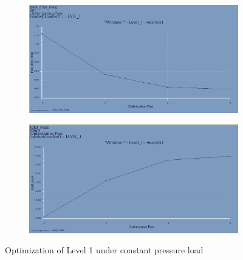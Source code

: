 \documentclass[12pt,letterpaper]{report}
\begin{document}
		\begin{figure}[H]
			\centering
			\begin{subfigure}{.45\textwidth}
				\includegraphics[width=\textwidth]{L1OptimDisp}
				\label{fig:L1PressureOptimDispGraph}
			\end{subfigure}
			\begin{subfigure}{.45\textwidth}
				\includegraphics[width=\textwidth]{L1OptimMass}
				\label{fig:L1PressureOptimMassGraph}
			\end{subfigure}
			\caption{Optimization of Level 1 under constant pressure load}
		\end{figure}
		
\end{document}
